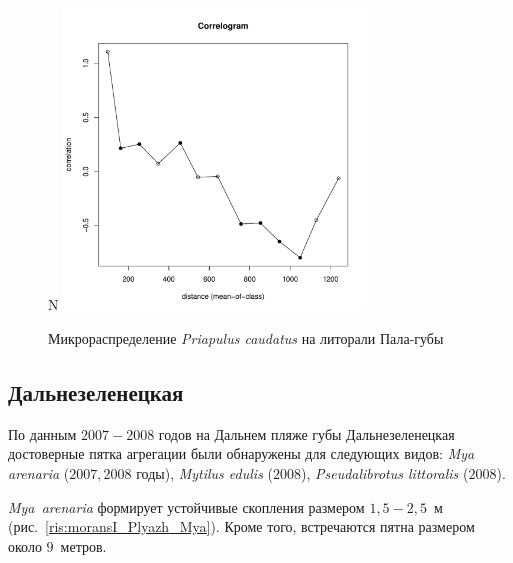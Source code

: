 \documentclass[12pt, a4paper]{disser}
\begin{document}
	\begin{figure}[h]
	\begin{minipage}[b]{.5\linewidth}
	\begin{center}
	{\small N}
		\includegraphics[width=80mm]{../Barenc_Sea/distribution_Moran/Pala_moran_N_Priapulus_caudatus_.pdf}
	\end{center}
	\end{minipage}

	\caption{Микрораспределение {\it Priapulus caudatus} на литорали Пала-губы}
	\label{ris:moransI_Pala_Priapulus}
	\end{figure}



	\subsection{Дальнезеленецкая}
По данным $2007 - 2008$ годов на Дальнем пляже губы Дальнезеленецкая достоверные пятка агрегации были обнаружены для следующих видов: {\it Mya arenaria} ($2007, 2008$ годы), {\it Mytilus edulis} ($2008$), {\it Pseudalibrotus littoralis} ($2008$).

{\it Mya~arenaria} формирует устойчивые скопления размером $1,5 - 2,5$~м (рис.~\ref{ris:moransI_Plyazh_Mya}). 
Кроме того, встречаются пятна размером около $9$~метров.
\end{document}
